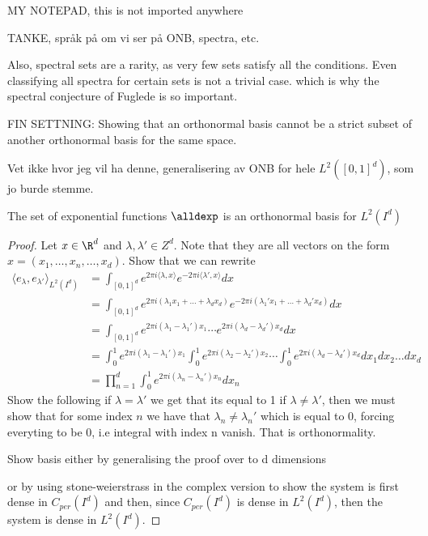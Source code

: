 

MY NOTEPAD, this is not imported anywhere


TANKE, språk på om vi ser på ONB, spectra, etc.

Also, spectral sets are a rarity, as very few sets satisfy all the conditions. 
Even classifying all spectra for certain sets is not a trivial case. which is why the spectral conjecture of Fuglede is so important. 


FIN SETTNING: Showing that an orthonormal basis cannot be a strict subset of another orthonormal basis for the same space. 

Vet ikke hvor jeg vil ha denne, generalisering av ONB for hele $L^2([0,1]^d)$, som jo burde stemme.
\begin{lemma}
    The set of exponential functions $\alldexp$ is an orthonormal basis for $L^2(I^d)$
\end{lemma}

\begin{proof}
    Let $x\in \R^d$ and $\lambda, \lambda' \in Z^d$. Note that they are all vectors on the form $x=(x_1,\dots, x_n, \dots, x_d)$.
    Show that we can rewrite 
    \begin{align*}
        \langle e_{\lambda},e_{\lambda'} \rangle_{L^2(I^d)} &= \int_{[0,1]^d} e^{2\pi i \langle\lambda, x\rangle} e^{-2 \pi i \langle \lambda', x\rangle} dx \\
        &= \int_{[0,1]^d} e^{2\pi i  (\lambda_1x_1 + \dots +\lambda_d x_d)} e^{-2\pi i  (\lambda_1' x_1 + \dots +\lambda_d' x_d)} dx\\
        &= \int_{[0,1]^d} e^{2\pi i  (\lambda_1 -\lambda_1')x_1} \cdots e^{2\pi i  (\lambda_d -\lambda_d')x_d} dx\\
        &= \int_0^1 e^{2\pi i  (\lambda_1- \lambda_1')x_1} \int_0^1 e^{2\pi i  (\lambda_2 - \lambda_2')x_2}  \cdots \int_0^1 e^{2\pi i  (\lambda_d - \lambda_d')x_d} dx_1 dx_2 \dots dx_d \\
        &=\prod_{n=1}^d \int_0^1 e^{2\pi i  (\lambda_n- \lambda_n')x_n} d x_n 
    \end{align*}
    Show the following 
    if $\lambda = \lambda'$ we get that its equal to 1
    if $\lambda \neq \lambda'$, then we must show that for some index $n$ we have that $\lambda_n \neq \lambda_n'$ which is equal to 0, forcing everyting to be 0, i.e integral with index n vanish.
    That is orthonormality.

    Show basis either by generalising the proof over to d dimensions
    
    or by using stone-weierstrass in the complex version to show the system is first dense in $C_{per}(I^d)$
    and then, since $C_{per}(I^d)$ is dense in $L^2(I^d)$, then the system is dense in $L^2(I^d)$. 

\end{proof}
